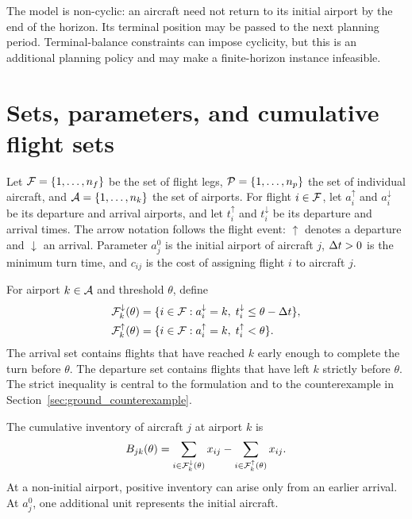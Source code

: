 The model is non-cyclic: an aircraft need not return to its initial airport by
the end of the horizon. Its terminal position may be passed to the next planning
period. Terminal-balance constraints can impose cyclicity, but this is an
additional planning policy and may make a finite-horizon instance infeasible.

\section{Sets, parameters, and cumulative flight sets}

Let $\mathcal{F}=\{1,\ldots,n_f\}$ be the set of flight legs,
$\mathcal{P}=\{1,\ldots,n_p\}$ the set of individual aircraft, and
$\mathcal{A}=\{1,\ldots,n_k\}$ the set of airports. For flight $i\in\mathcal{F}$, let
$a_i^{\uparrow}$ and $a_i^{\downarrow}$ be its departure and arrival airports,
and let $t_i^{\uparrow}$ and $t_i^{\downarrow}$ be its departure and arrival
times. The arrow notation follows the flight event: $\uparrow$ denotes a
departure and $\downarrow$ an arrival. Parameter $a_j^0$ is the initial airport
of aircraft $j$, $\Delta t>0$ is the minimum turn time, and $c_{ij}$ is the cost of
assigning flight $i$ to aircraft $j$.

For airport $k\in\mathcal{A}$ and threshold $\theta$, define
\begin{align}
    \mathcal{F}_k^{\downarrow}(\theta)
    &=\{i\in\mathcal{F}:a_i^{\downarrow}=k,\;
            t_i^{\downarrow}\leq\theta-\Delta t\},
            \label{eq:ground_arrival_set}\\
    \mathcal{F}_k^{\uparrow}(\theta)
    &=\{i\in\mathcal{F}:a_i^{\uparrow}=k,\;
            t_i^{\uparrow}<\theta\}.
            \label{eq:ground_departure_set}
\end{align}
The arrival set contains flights that have reached $k$ early enough to complete
the turn before $\theta$. The departure set contains flights that have left $k$
strictly before $\theta$. The strict inequality is central to the formulation
and to the counterexample in Section~\ref{sec:ground_counterexample}.

The cumulative inventory of aircraft $j$ at airport $k$ is
\begin{equation}
    B_{jk}(\theta)=
    \sum_{i\in\mathcal{F}_k^{\downarrow}(\theta)}x_{ij}
    -\sum_{i\in\mathcal{F}_k^{\uparrow}(\theta)}x_{ij}.
    \label{eq:ground_inventory}
\end{equation}
At a non-initial airport, positive inventory can arise only from an earlier
arrival. At $a_j^0$, one additional unit represents the initial aircraft.

